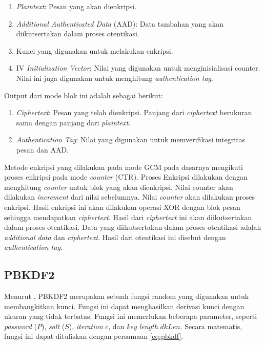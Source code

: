 \documentclass[conference]{IEEEtran}
\begin{document}
\begin{enumerate}
    \item \emph{Plaintext}: Pesan yang akan dienkripsi.
    \item \emph{Additional Authenticated Data} (AAD): Data tambahan yang akan diikutsertakan dalam proses otentikasi.
    \item Kunci yang digunakan untuk melakukan enkripsi.
    \item IV \emph{Initialization Vector}: Nilai yang digunakan untuk menginisialisasi counter. Nilai ini juga digunakan untuk menghitung \emph{authentication tag}.
\end{enumerate}

Output dari mode blok ini adalah sebagai berikut:

\begin{enumerate}
    \item \emph{Ciphertext}: Pesan yang telah dienkripsi. Panjang dari \emph{ciphertext} berukuran sama dengan panjang dari \emph{plaintext}.
    \item \emph{Authentication Tag}: Nilai yang digunakan untuk memverifikasi integritas pesan dan AAD.
\end{enumerate}

Metode enkripsi yang dilakukan pada mode GCM pada dasarnya mengikuti proses enkripsi pada mode \emph{counter} (CTR). Proses Enkripsi dilakukan dengan menghitung \emph{counter} untuk blok yang akan dienkripsi. Nilai counter akan dilakukan \emph{increment} dari nilai sebelumnya. Nilai \emph{counter} akan dilakukan proses enkripsi. Hasil enkripsi ini akan dilakukan operasi XOR dengan blok pesan sehingga mendapatkan \emph{ciphertext}. Hasil dari \emph{ciphertext} ini akan diikutsertakan dalam proses otentikasi. Data yang diikutsertakan dalam proses otentikasi adalah \emph{additional data} dan \emph{ciphertext}. Hasil dari otentikasi ini disebut dengan \emph{authentication tag}.

\subsection{PBKDF2}
Menurut \cite{pkcs5}, PBKDF2 merupakan sebuah fungsi random yang digunakan untuk membangkitkan kunci. Fungsi ini dapat menghasilkan derivasi kunci dengan ukuran yang tidak terbatas. Fungsi ini memerlukan beberapa parameter, seperti \emph{password} ($P$), \emph{salt} ($S$), \emph{iteration} $c$, dan \emph{key length} $dkLen$. Secara matematis, fungsi ini dapat dituliskan dengan persamaan \ref{eq:pbkdf}.
\end{document}

